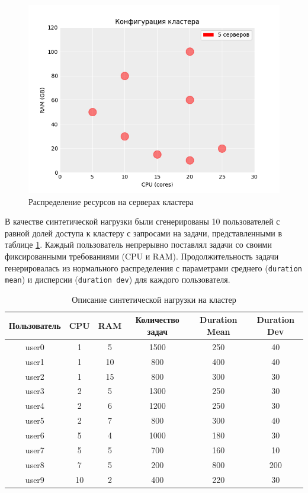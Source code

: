 \begin{figure}[h!]
    \centering 
    \includegraphics[width=0.7\linewidth]{images/hosts_distribution}
    \caption{Распределение ресурсов на серверах кластера}
    \label{fig:cluster-resources-distribution}
\end{figure}

В качестве синтетической нагрузки были сгенерированы 10 пользователей с равной долей доступа к кластеру с запросами на задачи, представленными в таблице \ref{tab:tasks_load_description}. Каждый пользователь непрерывно поставлял задачи со своими фиксированными требованиями (CPU и RAM). Продолжительность задачи генерировалась из нормального распределения с параметрами среднего (\texttt{duration mean}) и дисперсии (\texttt{duration dev}) для каждого пользователя. 

\begin{table}[h!]
    \centering
    \begin{tabular}{|c|c|c|c|c|c|}
        \hline
        \textbf{Пользователь} & \textbf{CPU} & \textbf{RAM} & \textbf{Количество задач} & \textbf{Duration Mean} & \textbf{Duration Dev} \\
        \hline
        user0 & 1 & 5 & 1500 & 250 & 40 \\
        \hline
        user1 & 1 & 10 & 800 & 400 & 40 \\
        \hline
        user2 & 1 & 15 & 800 & 300 & 30 \\
        \hline
        user3 & 2 & 5 & 1300 & 250 & 30 \\
        \hline
        user4 & 2 & 6 & 1200 & 250 & 30 \\
        \hline
        user5 & 2 & 7 & 800 & 300 & 40 \\
        \hline
        user6 & 5 & 4 & 1000 & 180 & 30 \\
        \hline
        user7 & 5 & 5 & 700 & 160 & 10 \\
        \hline
        user8 & 7 & 5 & 200 & 800 & 200 \\
        \hline
        user9 & 10 & 2 & 400 & 220 & 30 \\
        \hline
    \end{tabular}
    \caption{Описание синтетической нагрузки на кластер}
    \label{tab:tasks_load_description}
\end{table}


